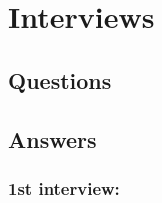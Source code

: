 

\section*{Interviews}

\subsection*{Questions}

\subsection*{Answers}

\subsubsection*{1st interview:}

\lipsum[3]